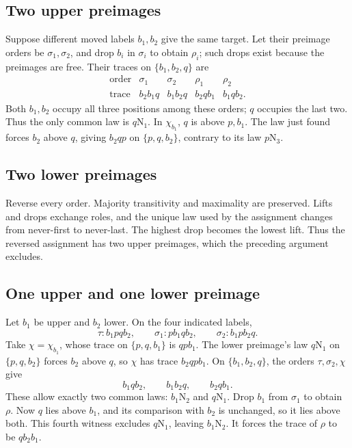 \documentclass[11pt,letterpaper]{article}
\theoremstyle{definition}
\newcommand{\N}[2]{#1\mathrm N_{#2}}
\begin{document}
\subsection*{Two upper preimages}
Suppose different moved labels \(b_1,b_2\) give the same target.
Let their preimage orders be \(\sigma_1,\sigma_2\), and drop
\(b_i\) in \(\sigma_i\) to obtain \(\rho_i\); such drops exist
because the preimages are free. Their traces on \(\{b_1,b_2,q\}\) are
\[
\begin{array}{c|cccc}
 \text{order}&\sigma_1&\sigma_2&\rho_1&\rho_2\\\hline
 \text{trace}&b_2b_1q&b_1b_2q&b_2qb_1&b_1qb_2.
\end{array}
\]
Both \(b_1,b_2\) occupy all three positions among these orders;
\(q\) occupies the last two. Thus the only common law is \(\N q1\).
In \(\chi_{b_1}\), \(q\) is above \(p,b_1\). The law just
found forces \(b_2\) above \(q\), giving \(b_2qp\) on
\(\{p,q,b_2\}\), contrary to its law \(\N p3\).

\subsection*{Two lower preimages}
Reverse every order. Majority transitivity and maximality are preserved.
Lifts and drops exchange roles, and the unique law used by the assignment
changes from never-first to never-last. The highest drop becomes the
lowest lift. Thus the reversed assignment has two upper preimages,
which the preceding argument excludes.

\subsection*{One upper and one lower preimage}
Let \(b_1\) be upper and \(b_2\) lower. On the four indicated labels,
\[
 \tau:b_1pqb_2,\qquad
 \sigma_1:pb_1qb_2,\qquad
 \sigma_2:b_1pb_2q.
\]
Take \(\chi=\chi_{b_1}\), whose trace on \(\{p,q,b_1\}\) is
\(qpb_1\). The lower preimage's law \(\N q1\) on
\(\{p,q,b_2\}\) forces \(b_2\) above \(q\), so \(\chi\)
has trace \(b_2qpb_1\). On \(\{b_1,b_2,q\}\), the orders
\(\tau,\sigma_2,\chi\) give
\[
 b_1qb_2,\qquad b_1b_2q,\qquad b_2qb_1.
\]
These allow exactly two common laws: \(\N{b_1}2\) and \(\N q1\).
Drop \(b_1\) from \(\sigma_1\) to obtain \(\rho\).
Now \(q\) lies above \(b_1\), and its comparison with \(b_2\)
is unchanged, so it lies above both. This fourth witness excludes
\(\N q1\), leaving \(\N{b_1}2\). It forces the trace of
\(\rho\) to be \(qb_2b_1\).
\end{document}
